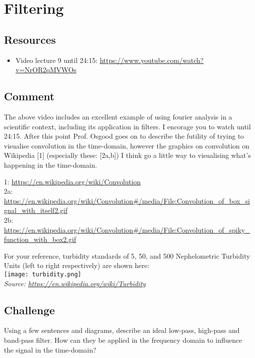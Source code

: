 \section{Filtering}

\subsection*{Resources}
\begin{itemize}
    \item Video lecture 9 until 24:15: \url{https://www.youtube.com/watch?v=NrOR2qMVWOs}
\end{itemize}

\subsection*{Comment}
The above video includes an excellent example of using fourier analysis in a scientific context, including its application in filters. I encorage you to watch until 24:15. After this point Prof. Osgood goes on to describe the futility of trying to visualise convolution in the time-domain, however the graphics on convolution on Wikipedia [1] (especially these: [2a,b]) I think go a little way to visualising what's happening in the time-domain.

1: \url{https://en.wikipedia.org/wiki/Convolution}\\
2a: \url{https://en.wikipedia.org/wiki/Convolution\#/media/File:Convolution_of_box_signal_with_itself2.gif}\\
2b: \url{https://en.wikipedia.org/wiki/Convolution\#/media/File:Convolution_of_spiky_function_with_box2.gif}

For your reference, turbidity standards of 5, 50, and 500 Nephelometric Turbidity Units (left to right respectively) are shown here:\\
\texttt{[image: turbidity.png]}\\
\emph{Source: \url{https://en.wikipedia.org/wiki/Turbidity}}

\subsection*{Challenge}

Using a few sentences and diagrams, describe an ideal low-pass, high-pass and band-pass filter. How can they be applied in the frequency domain to influence the signal in the time-domain?

